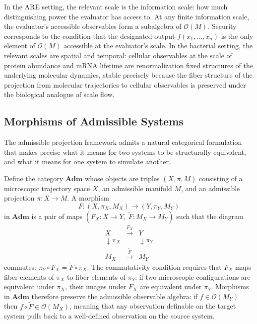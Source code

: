 \documentclass[12pt, a4paper]{article}
\theoremstyle{essaystyle}
\begin{document}
In the ARE setting, the relevant scale is the information scale: how much
distinguishing power the evaluator has access to. At any finite information scale, the
evaluator's accessible observables form a subalgebra of $\mathcal{O}(M)$. Security
corresponds to the condition that the designated output $f(x_1, \ldots, x_n)$ is the
only element of $\mathcal{O}(M)$ accessible at the evaluator's scale. In the bacterial
setting, the relevant scales are spatial and temporal: cellular observables at the
scale of protein abundance and mRNA lifetime are renormalization fixed structures of
the underlying molecular dynamics, stable precisely because the fiber structure of
the projection from molecular trajectories to cellular observables is preserved under
the biological analogue of scale flow.

\subsection{Morphisms of Admissible Systems}

The admissible projection framework admits a natural categorical formulation that
makes precise what it means for two systems to be structurally equivalent, and what
it means for one system to simulate another.

Define the category $\mathbf{Adm}$ whose objects are triples $(X, \pi, M)$
consisting of a microscopic trajectory space $X$, an admissible manifold $M$, and
an admissible projection $\pi : X \to M$. A morphism
\[
F : (X, \pi_X, M_X) \longrightarrow (Y, \pi_Y, M_Y)
\]
in $\mathbf{Adm}$ is a pair of maps $(F_X : X \to Y,\; \tilde{F} : M_X \to M_Y)$
such that the diagram
\[
\begin{array}{ccc}
X & \xrightarrow{F_X} & Y \\
\downarrow \pi_X & & \downarrow \pi_Y \\
M_X & \xrightarrow{\tilde{F}} & M_Y
\end{array}
\]
commutes: $\pi_Y \circ F_X = \tilde{F} \circ \pi_X$. The commutativity condition
requires that $F_X$ maps fiber elements of $\pi_X$ to fiber elements of $\pi_Y$:
if two microscopic configurations are equivalent under $\pi_X$, their images under
$F_X$ are equivalent under $\pi_Y$. Morphisms in $\mathbf{Adm}$ therefore preserve
the admissible observable algebra: if $f \in \mathcal{O}(M_Y)$ then
$f \circ \tilde{F} \in \mathcal{O}(M_X)$, meaning that any observation definable
on the target system pulls back to a well-defined observation on the source system.
\end{document}
